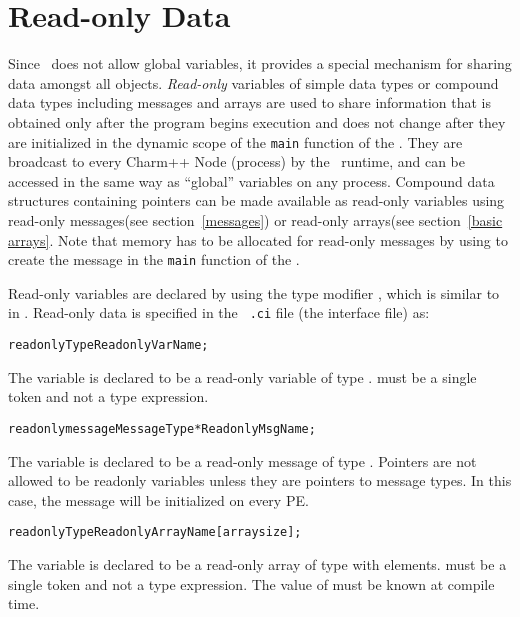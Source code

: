 \section{Read-only Data}
\label{readonly}

Since \charmpp\ does not allow global variables,
it provides a special mechanism for sharing
data amongst all objects. {\it Read-only} variables of simple data types or
compound data types including messages and arrays are used to share information
that is obtained only after the program begins execution and does not change
after they are initialized in the dynamic scope of the {\tt main} function of
the . They are broadcast to every Charm++ Node (process) by the \charmpp\ runtime,
and can be accessed in the same way as \CC ``global'' variables on any process.
Compound data structures containing pointers can be made available as read-only
variables using read-only messages(see section~\ref{messages}) or read-only arrays(see section~\ref{basic arrays}.  Note that memory
has to be allocated for read-only messages by using  to create the
message in the {\tt main} function of the . 

Read-only variables are declared by using the type modifier ,
which is similar to  in \CC. Read-only data is specified in the {\tt
.ci} file (the interface file) as: 

\begin{alltt}
 readonly Type ReadonlyVarName;
\end{alltt}

The variable  is declared to be a read-only variable of
type .  must be a single token and not a type expression.

\begin{alltt}
 readonly message MessageType *ReadonlyMsgName;
\end{alltt}

The variable  is declared to be a read-only message of type
. Pointers are not allowed to be readonly variables unless they
are pointers to message types. In this case, the message will be initialized on
every PE.

\begin{alltt}
 readonly Type ReadonlyArrayName [arraysize];
\end{alltt}

The variable  is declared to be a read-only array of type
 with  elements.  must be a single token and
not a type expression. The value of  must be known at compile
time.

